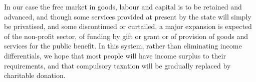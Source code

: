 In our case the free market in goods, labour and capital is to be retained and advanced, and though some services provided at present by the state will simply be privatised, and some discontinued or curtailed, a major expansion is expected of the non-profit sector, of funding by gift or grant or of provision of goods and services for the public benefit.
In this system, rather than eliminating income differentials, we hope that most people will have income surplus to their requirements, and that compulsory taxation will be gradually replaced by charitable donation.

